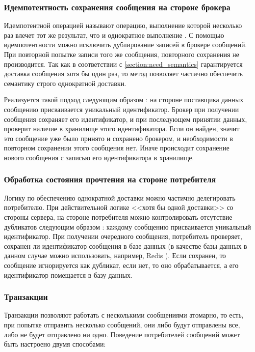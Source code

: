 \subsubsection{Идемпотентность сохранения сообщения на стороне брокера}
Идемпотентной операцией называют операцию, выполнение которой нес\-колько раз влечет тот же результат, что и однократное выполнение \cite{bib:5}. 
С помощью идемпотентности можно исключить дублирование записей в брокере сообщений. 
При повторной попытке записи того же сообщения, повторного сохранения не производится. 
Так как в соответствии с \ref{section:need_semantics} гарантируется доставка сообщения хотя бы один раз, то метод позволяет частично обеспечить семантику строго однократной доставки.

Реализуется такой подход следующим образом \cite{bib:7}: на стороне поставщика данных сообщению присваивается уникальный идентификатор. 
Брокер при получении сообщения сохраняет его идентификатор, и при последующем принятии данных, проверит наличие в хранилище этого идентификатора. 
Если он найден, значит это сообщение уже было принято и сохранено брокером, и необходимости в повторном сохранении этого сообщения нет. 
Иначе происходит сохранение нового сообщения с записью его идентификатора в хранилище.

\subsubsection{Обработка состояния прочтения на стороне потребителя}
Логику по обеспечению однократной доставки можно частично делегировать потребителю. 
При действительной логике <<хотя бы одной доставки>> со стороны сервера, на стороне потребителя можно контролировать отсутствие дубликатов следующим образом \cite{bib:2}: каждому сообщению присваивается уникальный идентификатор. 
При получении очередного сообщения, потребитель проверяет, сохранен ли идентификатор сообщения в базе данных (в качестве базы данных в данном случае можно использовать, например, Redis \cite{bib:10}). 
Если сохранен, то сообщение игнорируется как дубликат, если нет, то оно обрабатывается, а его идентификатор помещается в базу данных.

\subsubsection{Транзакции}
Транзакции позволяют работать с несколькими сообщениями атомарно, то есть, при попытке отправить несколько сообщений, они либо будут отправлены все, либо не будет отправлено ни одно. Поведение потребителей сообщений может быть настроено двумя способами:

